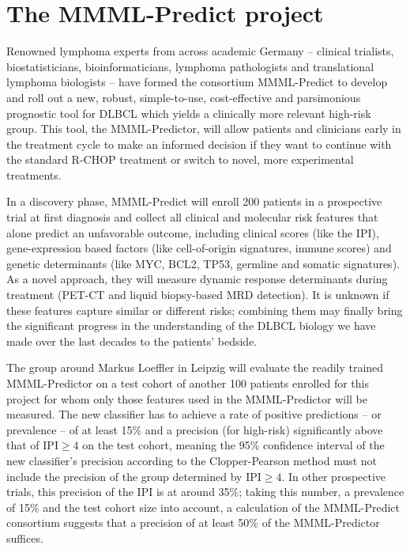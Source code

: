 \section{The MMML-Predict project} \label{sec:intro-mmml}

Renowned lymphoma experts from across academic Germany -- clinical trialists, biostatisticians, 
bioinformaticians, lymphoma pathologists and translational lymphoma biologists -- have formed the 
consortium MMML-Predict to develop and roll out a new, robust, simple-to-use, cost-effective and 
parsimonious prognostic tool for DLBCL 
which yields a clinically more relevant high-risk group. This tool, the MMML-Predictor, will allow 
patients and clinicians early in the treatment cycle to make an informed decision if they want to 
continue with the standard R-CHOP treatment or switch to novel, more experimental treatments. 

In a discovery phase, MMML-Predict will enroll 200 patients in a prospective trial at first diagnosis and 
collect all clinical and molecular risk features that alone predict an unfavorable outcome, 
including clinical scores (like the IPI), gene-expression based factors (like cell-of-origin signatures,
immune scores) and genetic determinants (like MYC, BCL2, TP53, germline and somatic signatures).
As a novel approach, they will measure dynamic response determinants during treatment (PET-CT 
and liquid biopsy-based MRD detection). It is unknown if these features capture similar or different 
risks; combining them may finally bring the significant progress in the understanding of the DLBCL 
biology we have made over the last decades to the patients' bedside.

The group around Markus Loeffler in Leipzig will evaluate the readily trained MMML-Predictor on a 
test cohort of another 100 patients enrolled for this project for whom only those features used 
in the MMML-Predictor will be measured. The new classifier has to achieve a rate of positive 
predictions -- or prevalence -- of at least \num{15}\% and a precision (for high-risk) significantly above that of 
$\text{IPI} \geq 4$ on the test cohort, meaning the \num{95}\% confidence interval of the new 
classifier's precision according to the Clopper-Pearson method must not include the precision of 
the group determined by $\text{IPI} \geq 4$. In other prospective trials, this precision of the IPI 
is at around \num{35}\%; taking this number, a prevalence of \num{15}\% and the test cohort size into 
account, a calculation of the MMML-Predict consortium suggests that a precision of at least \num{50}\%
of the MMML-Predictor suffices.

